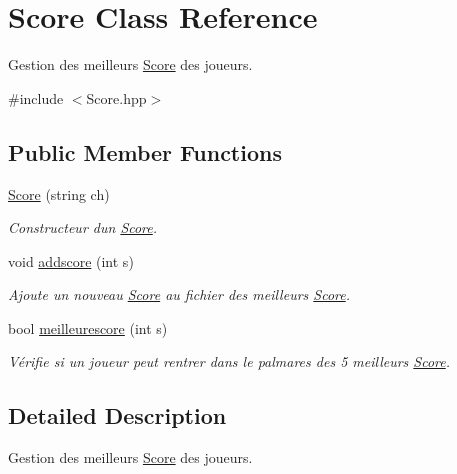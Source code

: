 \hypertarget{classScore}{}\section{Score Class Reference}
\label{classScore}


Gestion des meilleurs \hyperlink{classScore}{Score} des joueurs.  




{\ttfamily \#include $<$Score.\+hpp$>$}

\subsection*{Public Member Functions}
\begin{DoxyCompactItemize}
\item 
\hyperlink{classScore_a93772a8d3e8c9f71cd3e4a0bf74d9e78}{Score} (string ch)
\begin{DoxyCompactList}\small\item\em Constructeur d\textquotesingle{}un \hyperlink{classScore}{Score}. \end{DoxyCompactList}\item 
void \hyperlink{classScore_a6575097aed9e43ec2b8c5926e00134c1}{addscore} (int s)
\begin{DoxyCompactList}\small\item\em Ajoute un nouveau \hyperlink{classScore}{Score} au fichier des meilleurs \hyperlink{classScore}{Score}. \end{DoxyCompactList}\item 
bool \hyperlink{classScore_aed385c5969860d59ca1477e2699c2f54}{meilleurescore} (int s)
\begin{DoxyCompactList}\small\item\em Vérifie si un joueur peut rentrer dans le palmares des 5 meilleurs \hyperlink{classScore}{Score}. \end{DoxyCompactList}\end{DoxyCompactItemize}


\subsection{Detailed Description}
Gestion des meilleurs \hyperlink{classScore}{Score} des joueurs. 


